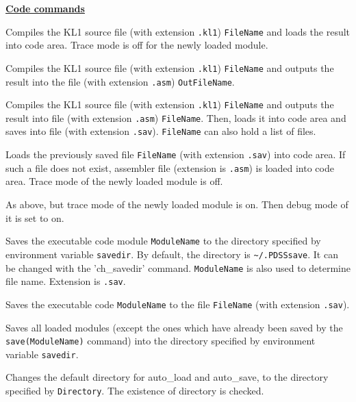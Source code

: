 \noindent\underline{\bf Code commands}
\vspace{1ex}\par
\begin{itemize}

Compiles the KL1 source file (with extension \verb|.kl1|)
\verb|FileName| and loads the result into code area. 
Trace mode is off for the newly loaded module.

Compiles the KL1 source file (with extension \verb|.kl1|)
\verb|FileName| and outputs the result into the file
(with extension \verb|.asm|) \verb|OutFileName|.

Compiles the KL1 source file (with extension \verb|.kl1|)
\verb|FileName| and outputs the result into file (with extension \verb|.asm|)
\verb|FileName|. Then, loads it into code area and saves into file (with 
extension \verb|.sav|).
\verb|FileName| can also hold a list of files.

Loads the previously saved file \verb|FileName|
(with extension
\verb|.sav|) into code area.
If such a file does not exist, assembler file (extension is \verb|.asm|)
is loaded into code area. Trace mode of the newly loaded module is off.

As above, but trace mode of the newly loaded module is on.
Then debug mode of it is set to on.

Saves the executable code module \verb|ModuleName| to the directory 
specified by environment variable \verb|savedir|. By default, the directory is 
\verb|~/.PDSSsave|. It can be changed with the 'ch_savedir' command.
\verb|ModuleName| is also used to determine file name.
Extension is \verb|.sav|.

Saves the executable code \verb|ModuleName| to the file
\verb|FileName| (with extension \verb|.sav|).

Saves all loaded modules (except the ones which have already been saved by the 
\verb|save(ModuleName)| command) into the directory specified by environment
variable \verb|savedir|.

Changes the default directory for auto_load and auto_save, to the directory 
specified by \verb|Directory|. The existence of directory is checked.


\end{itemize}
